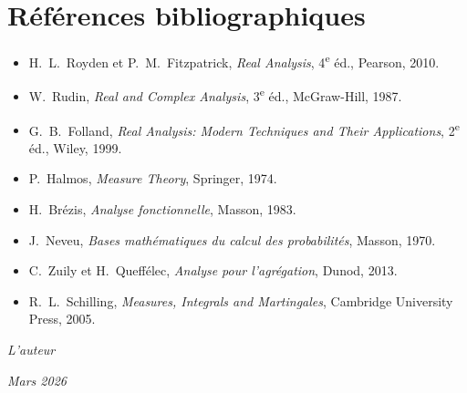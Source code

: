 \section*{R\'ef\'erences bibliographiques}

\begin{itemize}
    \item H.~L.~Royden et P.~M.~Fitzpatrick, \emph{Real Analysis}, 4\textsuperscript{e}
    \'ed., Pearson, 2010.
    \item W.~Rudin, \emph{Real and Complex Analysis}, 3\textsuperscript{e} \'ed.,
    McGraw-Hill, 1987.
    \item G.~B.~Folland, \emph{Real Analysis: Modern Techniques and Their Applications},
    2\textsuperscript{e} \'ed., Wiley, 1999.
    \item P.~Halmos, \emph{Measure Theory}, Springer, 1974.
    \item H.~Br\'ezis, \emph{Analyse fonctionnelle}, Masson, 1983.
    \item J.~Neveu, \emph{Bases math\'ematiques du calcul des probabilit\'es},
    Masson, 1970.
    \item C.~Zuily et H.~Queff\'elec, \emph{Analyse pour l'agr\'egation}, Dunod, 2013.
    \item R.~L.~Schilling, \emph{Measures, Integrals and Martingales}, Cambridge
    University Press, 2005.
\end{itemize}

\bigskip
\hfill \emph{L'auteur}

\hfill \emph{Mars 2026}
